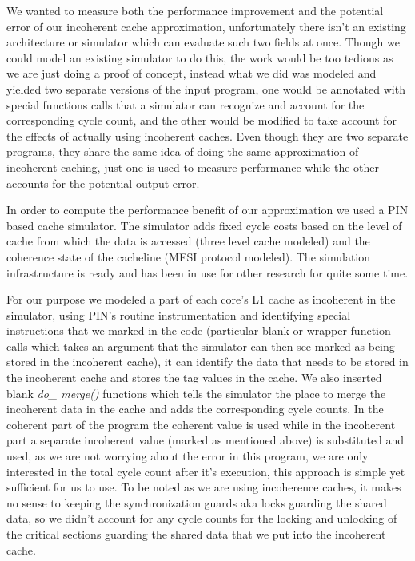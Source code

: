 \documentclass[12pt,conference]{IEEEtran}
\begin{document}
We wanted to measure both the performance improvement and the potential
error of our incoherent cache approximation, unfortunately there isn't
an existing architecture or simulator which can evaluate such two fields at
once. Though we could model an existing simulator to do this, the work
would be too tedious as we are just doing a proof of concept, instead
what we did was modeled and yielded two separate versions of the input
program, one would be annotated with special functions calls that a
simulator can recognize and account for the corresponding cycle count,
and the other would be modified to take account for the effects of
actually using incoherent caches. Even though they are two separate 
programs, they share the same idea of doing the same approximation of
incoherent caching, just one is used to measure performance while the
other accounts for the potential output error.

In order to compute the performance benefit of our approximation
we used a PIN\cite{pin} based cache simulator. The simulator adds 
fixed cycle costs based on the level of cache from which the
data is accessed (three level cache modeled) and the coherence
state of the cacheline (MESI protocol modeled). The simulation
infrastructure is ready and has been in use for other research
for quite some time.

For our purpose we modeled a part of each core's L1 cache as incoherent
in the simulator, using PIN's routine instrumentation and identifying
special instructions that we marked in the code (particular blank or 
wrapper function calls which takes an argument that the simulator can 
then see marked as being stored in the incoherent cache), it can identify 
the data that needs to be stored in the incoherent cache and stores the
tag values in the cache. We also inserted blank \textit{do\_ merge()}
functions which tells the simulator the place to merge the incoherent
data in the cache and adds the corresponding cycle counts. In the 
coherent part of the program the coherent value is used while in the
incoherent part a separate incoherent value (marked as mentioned above)
is substituted and used, as we are not worrying about the error in
this program, we are only interested in the total cycle count after
it's execution, this approach is simple yet sufficient for us to use.
To be noted as we are using incoherence caches, it makes no sense
to keeping the synchronization guards aka locks guarding the shared
data, so we didn't account for any cycle counts for the locking and
unlocking of the critical sections guarding the shared data that
we put into the incoherent cache.
\end{document}
